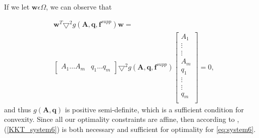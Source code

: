 If we let $\bm{w}  \epsilon  \Omega$, we can observe that

\begin{align*}
&\bm{w}^T\bm{\bigtriangledown}^2 g(\bm{A},\bm{q},\bm{f}^{supp})\bm{w} = \\
&\begin{bmatrix}
A_1 \hdots A_m & q_1 \hdots q_m
\end{bmatrix}
\bm{\bigtriangledown}^2 g(\bm{A},\bm{q},\bm{f}^{supp})
\begin{bmatrix}
A_1 \\
\vdots\\
\vdots\\
A_m\\
q_1\\
\vdots\\
\vdots\\
q_m\\
\end{bmatrix} = 0,
\end{align*}
and thus $g(\bm{A},\bm{q})$ is positive semi-definite, which is a sufficient condition for convexity. Since all our optimality constraints are affine, then according to \cite{KKT_suff}, (\ref{KKT_system6}) is both necessary and sufficient for optimality for \eqref{eq:system6}.


